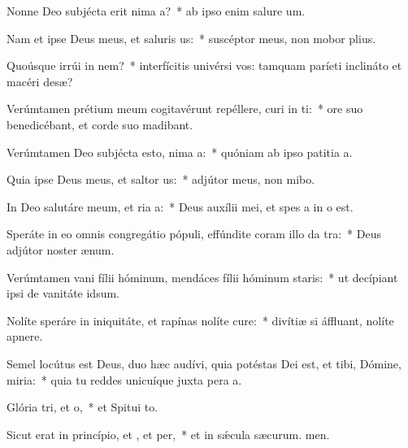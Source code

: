 \item Nonne Deo subjécta erit nima a?~* ab ipso enim salure um.
\item Nam et ipse Deus meus, et saluris us:~* suscéptor meus, non mobor plius.
\item Quoúsque irrúi in nem?~* interfícitis univérsi vos: tamquam paríeti inclináto et macéri desæ?
\item Verúmtamen prétium meum cogitavérunt repéllere, curi in ti:~* ore suo benedicébant, et corde suo madibant.
\item Verúmtamen Deo subjécta esto, nima a:~* quóniam ab ipso patitia a.
\item Quia ipse Deus meus, et saltor us:~* adjútor meus, non mibo.
\item In Deo salutáre meum, et ria a:~* Deus auxílii mei, et spes a in o est.
\item Speráte in eo omnis congregátio pópuli, effúndite coram illo da tra:~* Deus adjútor noster  ænum.
\item Verúmtamen vani fílii hóminum, mendáces fílii hóminum  staris:~* ut decípiant ipsi de vanitáte  idsum.
\item Nolíte speráre in iniquitáte, et rapínas nolíte cure:~* divítiæ si áffluant, nolíte  apnere.
\item Semel locútus est Deus, duo hæc audívi, quia potéstas Dei est, et tibi, Dómine, miria:~* quia tu reddes unicuíque juxta pera a.
\item Glória tri, et o,~* et Spitui to.
\item Sicut erat in princípio, et , et per,~* et in sǽcula sæcurum. men.
